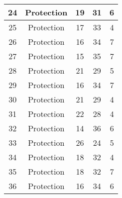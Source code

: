\documentclass[results.tex]{subfiles}
\begin{document}
\begin{center}
\begin{tabular}{| c || c | c | c | c |}
            \hline
            24                      & Protection                   & 19                     & 31                      & 6                    \\
            \hline
            25                      & Protection                   & 17                     & 33                      & 4                    \\
            \hline
            26                      & Protection                   & 16                     & 34                      & 7                    \\
            \hline
            27                      & Protection                   & 15                     & 35                      & 7                    \\
            \hline
            28                      & Protection                   & 21                     & 29                      & 5                    \\
            \hline
            29                      & Protection                   & 16                     & 34                      & 7                    \\
            \hline
            30                      & Protection                   & 21                     & 29                      & 4                    \\
            \hline
            31                      & Protection                   & 22                     & 28                      & 4                    \\
            \hline
            32                      & Protection                   & 14                     & 36                      & 6                    \\
            \hline
            33                      & Protection                   & 26                     & 24                      & 5                    \\
            \hline
            34                      & Protection                   & 18                     & 32                      & 4                    \\
            \hline
            35                      & Protection                   & 18                     & 32                      & 7                    \\
            \hline
            36                      & Protection                   & 16                     & 34                      & 6                    \\

\end{tabular}
\end{center}
\end{document}
